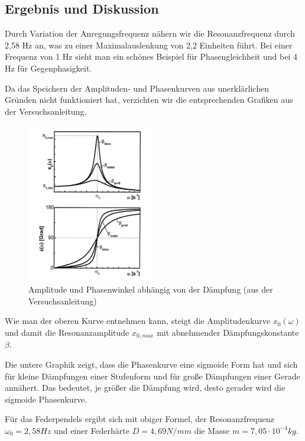 \documentclass{scrartcl}
\begin{document}
\subsection{Ergebnis und Diskussion}
Durch Variation der Anregungsfrequenz nähern wir die Resonanzfrequenz durch 2,58 Hz an, was zu einer Maximalauslenkung von 2,2 Einheiten führt. Bei einer Frequenz von 1 Hz sieht man ein schönes Beispiel für Phasengleichheit und bei 4 Hz für Gegenphasigkeit. 

Da das Speichern der Amplituden- und Phasenkurven aus unerklärlichen Gründen nicht funktioniert hat, verzichten wir die entsprechenden Grafiken aus der Versuchsanleitung.
\begin{figure}[h]
  \caption{Amplitude und Phasenwinkel abhängig von der Dämpfung (aus der Versuchsanleitung)}
  \centering
    \includegraphics[width=0.5\textwidth]{phasenkurve.PNG}
\end{figure}
Wie man der oberen Kurve entnehmen kann, steigt die Amplitudenkurve $x_{0}(\omega)$ und damit die Resonanzamplitude $x_{0,max}$ mit abnehmender Dämpfungskonstante $\beta$.

Die untere Graphik zeigt, dass die Phasenkurve eine sigmoide Form hat und sich für kleine Dämpfungen einer Stufenform und für große Dämpfungen einer Gerade annähert. Das bedeutet, je größer die Dämpfung wird, desto gerader wird die sigmoide Phasenkurve.

Für das Federpendels ergibt sich mit obiger Formel, der Resonanzfrequenz $\omega_{0} = 2,58 Hz$ und einer Federhärte $D = 4,69 N/mm$ die Masse $m = 7,05 \cdot 10^{-4}kg$.
\end{document}

